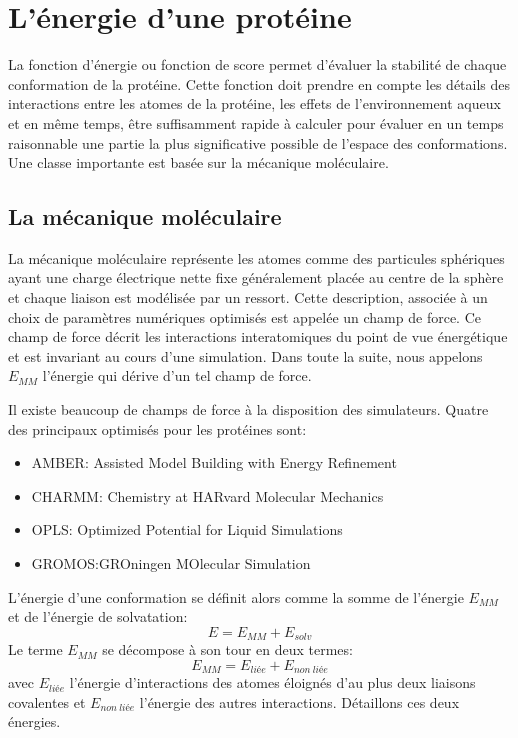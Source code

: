 \section{L'énergie d'une protéine}

La fonction d'énergie ou fonction de score permet d'évaluer la stabilité de chaque conformation de la protéine. Cette fonction doit prendre en compte les détails des interactions entre les atomes de la protéine, les effets de l'environnement aqueux et en même temps, être suffisamment rapide à calculer pour évaluer en un temps raisonnable une partie la plus significative possible de l'espace des conformations. Une classe importante est basée sur la mécanique moléculaire.

\subsection{La mécanique moléculaire}
\label{sub:mecamol}
La mécanique moléculaire représente les atomes comme des particules sphériques ayant une charge électrique nette fixe généralement placée au centre de la sphère et chaque liaison est modélisée par un ressort. Cette description, associée à un choix de paramètres numériques optimisés est appelée un champ de force. Ce champ de force décrit les interactions interatomiques du point de vue énergétique et est invariant au cours d'une simulation.
Dans toute la suite, nous appelons $E_{MM}$ l'énergie qui dérive d'un tel champ de force.

Il existe beaucoup de champs de force à la disposition des simulateurs. Quatre des principaux optimisés pour les protéines sont:

\begin{itemize}
\item AMBER: Assisted Model Building with Energy Refinement \cite{Cornell95}
\item CHARMM: Chemistry at HARvard Molecular Mechanics \cite{Brooks09}
\item OPLS: Optimized Potential for Liquid Simulations \cite{Jorgensen88}
\item GROMOS:GROningen MOlecular Simulation \cite{Christen05}
\end{itemize}
L'énergie d'une conformation se définit alors comme la somme de l'énergie $E_{MM}$  et de l'énergie de solvatation:
\begin{equation}
  E = E_{MM} + E_{solv}
\end{equation}
Le terme $E_{MM}$ se décompose à son tour en deux termes:
\begin{equation}
  E_{MM} = E_{liée} + E_{non\ liée}
\end{equation}
avec $E_{liée}$ l'énergie d'interactions des atomes éloignés d'au plus deux liaisons covalentes et $E_{non\ liée}$  l'énergie des autres interactions. Détaillons ces deux énergies.

